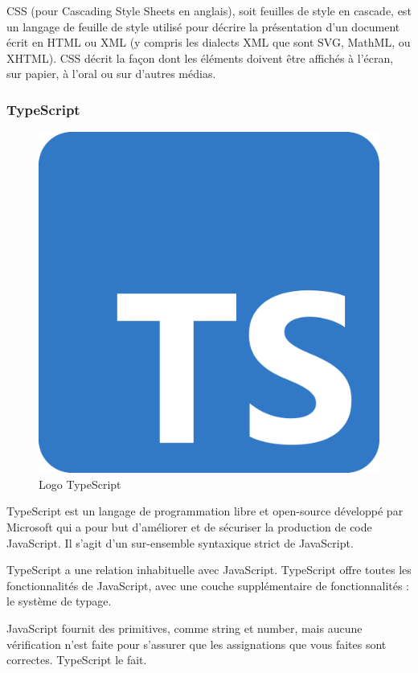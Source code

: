 CSS (pour Cascading Style Sheets en anglais), soit feuilles de style en cascade, est un langage de feuille de style utilisé pour décrire la présentation d'un document écrit en HTML ou XML (y compris les dialects XML que sont SVG, MathML, ou XHTML). CSS décrit la façon dont les éléments doivent être affichés à l'écran, sur papier, à l'oral ou sur d'autres médias.

\subsubsection{TypeScript}

\begin{figure}[H]
    \centering
    \includegraphics[scale=0.05]{Logos/Typescript.png}
    \caption{Logo TypeScript}
\end{figure}

TypeScript est un langage de programmation libre et open-source développé par Microsoft qui a pour but d'améliorer et de sécuriser la production de code JavaScript. Il s'agit d'un sur-ensemble syntaxique strict de JavaScript.

TypeScript a une relation inhabituelle avec JavaScript. TypeScript offre toutes les fonctionnalités de JavaScript, avec une couche supplémentaire de fonctionnalités : le système de typage.

JavaScript fournit des primitives, comme string et number, mais aucune vérification n’est faite pour s’assurer que les assignations que vous faites sont correctes. TypeScript le fait.

